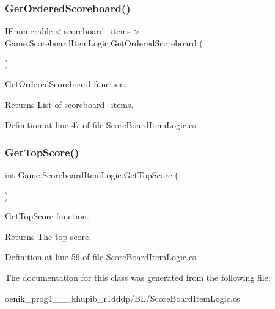 \subsubsection{\texorpdfstring{GetOrderedScoreboard()}{GetOrderedScoreboard()}}
{\footnotesize\ttfamily I\+Enumerable$<$\mbox{\hyperlink{class_game_1_1_data_1_1scoreboard__items}{scoreboard\+\_\+items}}$>$ Game.\+Scoreboard\+Item\+Logic.\+Get\+Ordered\+Scoreboard (\begin{DoxyParamCaption}{ }\end{DoxyParamCaption})}



Get\+Ordered\+Scoreboard function. 

\begin{DoxyReturn}{Returns}
List of scoreboard\+\_\+items.
\end{DoxyReturn}


Definition at line 47 of file Score\+Board\+Item\+Logic.\+cs.

\mbox{\label{class_game_1_1_scoreboard_item_logic_a15723a6bd6bcdeab079a2b40869b1c85}} 
\subsubsection{\texorpdfstring{GetTopScore()}{GetTopScore()}}
{\footnotesize\ttfamily int Game.\+Scoreboard\+Item\+Logic.\+Get\+Top\+Score (\begin{DoxyParamCaption}{ }\end{DoxyParamCaption})}



Get\+Top\+Score function. 

\begin{DoxyReturn}{Returns}
The top score.
\end{DoxyReturn}


Definition at line 59 of file Score\+Board\+Item\+Logic.\+cs.



The documentation for this class was generated from the following file\+:\begin{DoxyCompactItemize}
\item 
oenik\+\_\+prog4\+\_\+\_\+\_\+khupib\+\_\+r1dddp/\+B\+L/Score\+Board\+Item\+Logic.\+cs\end{DoxyCompactItemize}
